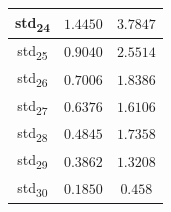 \documentclass[12pt]{article}
\begin{document}
\begin{table}
\begin{tabular}{||c c c||}
			\hline
			std\textsubscript{24} & $1.4450$ & $3.7847$ \\
			\hline
			std\textsubscript{25} & $0.9040$ & $2.5514$ \\
			\hline
			std\textsubscript{26} & $0.7006$ & $1.8386$ \\
			\hline
			std\textsubscript{27} & $0.6376$ & $1.6106$ \\
			\hline
			std\textsubscript{28} & $0.4845$ & $1.7358$ \\
			\hline
			std\textsubscript{29} & $0.3862$ & $1.3208$ \\
			\hline
			std\textsubscript{30} & $0.1850$ & $0.458$ \\
			\hline
		\end{tabular}
	\label{Tab:Features_4_2}
\end{table}
\end{document}
